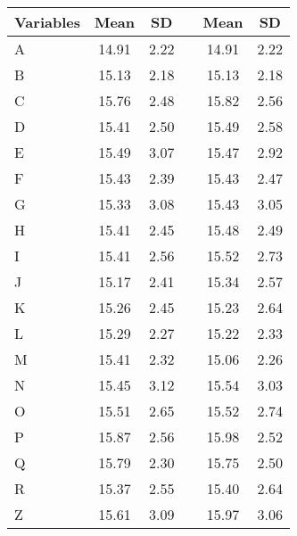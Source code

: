 \begin{tabular}{lccccc}
\toprule
Variables & Mean & SD &  \multicolumn{1}{l}{} & Mean & SD \\
\midrule
\hspace{3mm}A & 14.91 & 2.22 &   & 14.91 & 2.22 \\
\hspace{3mm}B & 15.13 & 2.18 &   & 15.13 & 2.18 \\
\hspace{3mm}C & 15.76 & 2.48 &   & 15.82 & 2.56 \\
\hspace{3mm}D & 15.41 & 2.50 &   & 15.49 & 2.58 \\
\hspace{3mm}E & 15.49 & 3.07 &   & 15.47 & 2.92 \\
\hspace{3mm}F & 15.43 & 2.39 &   & 15.43 & 2.47 \\
\hspace{3mm}G & 15.33 & 3.08 &   & 15.43 & 3.05 \\
\hspace{3mm}H & 15.41 & 2.45 &   & 15.48 & 2.49 \\
\hspace{3mm}I & 15.41 & 2.56 &   & 15.52 & 2.73 \\
\hspace{3mm}J & 15.17 & 2.41 &   & 15.34 & 2.57 \\
\hspace{3mm}K & 15.26 & 2.45 &   & 15.23 & 2.64 \\
\hspace{3mm}L & 15.29 & 2.27 &   & 15.22 & 2.33 \\
\hspace{3mm}M & 15.41 & 2.32 &   & 15.06 & 2.26 \\
\hspace{3mm}N & 15.45 & 3.12 &   & 15.54 & 3.03 \\
\hspace{3mm}O & 15.51 & 2.65 &   & 15.52 & 2.74 \\
\hspace{3mm}P & 15.87 & 2.56 &   & 15.98 & 2.52 \\
\hspace{3mm}Q & 15.79 & 2.30 &   & 15.75 & 2.50 \\
\hspace{3mm}R & 15.37 & 2.55 &   & 15.40 & 2.64 \\
\hspace{3mm}Z & 15.61 & 3.09 &   & 15.97 & 3.06 \\
\bottomrule
\end{tabular}
